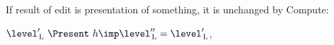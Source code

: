 %
%
%
%
%
%
%



If result of edit is presentation of something, it is unchanged by {\sc Compute}: 

$\level'\L~\Present~h \imp \level''\L = \level'\L$,

